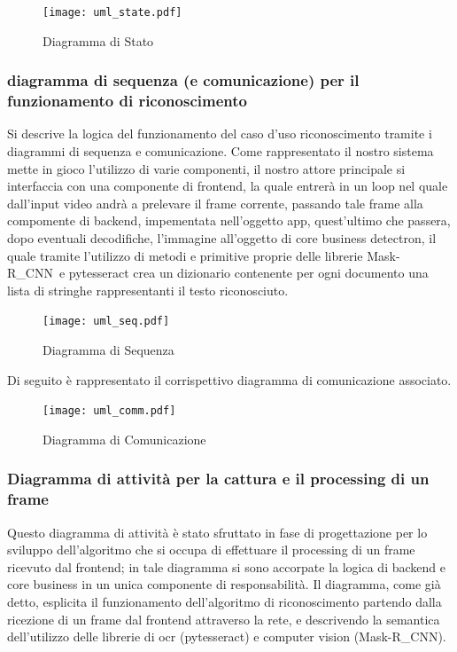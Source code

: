 \documentclass[12pt,a4paper]{article}
\newcommand{\mrcnn}{Mask-R\_CNN}
\begin{document}
\begin{figure}[H]
    \caption{Diagramma di Stato}
    \centering
    \texttt{[image: uml\_state.pdf]}
\end{figure}

\subsubsection{diagramma di sequenza (e comunicazione) per il
funzionamento di riconoscimento}

Si descrive la logica del funzionamento del caso d'uso riconoscimento
tramite i diagrammi di sequenza e comunicazione.
Come rappresentato il nostro sistema mette in gioco l'utilizzo di varie
componenti, il nostro attore principale si interfaccia con una
componente di frontend, la quale entrerà in un loop nel quale dall'input
video andrà a prelevare il frame corrente, passando tale frame alla
compomente di backend, impementata nell'oggetto app, quest'ultimo che
passera, dopo eventuali decodifiche, l'immagine all'oggetto di core
business detectron, il quale tramite l'utilizzo di metodi e primitive
proprie delle librerie \mrcnn\ e pytesseract crea un dizionario
contenente per ogni documento una lista di stringhe rappresentanti il
testo riconosciuto.

\begin{figure}[H]
    \caption{Diagramma di Sequenza}
    \centering
    \texttt{[image: uml\_seq.pdf]}
\end{figure}

Di seguito è rappresentato il corrispettivo diagramma di comunicazione
associato.

\begin{figure}[H]
    \caption{Diagramma di Comunicazione}
    \centering
    \texttt{[image: uml\_comm.pdf]}
\end{figure}

\subsubsection{Diagramma di attività per la cattura e il processing di un frame}

Questo diagramma di attività è stato sfruttato in fase di progettazione
per lo sviluppo dell'algoritmo che si occupa di effettuare il processing
di un frame ricevuto dal frontend; in tale diagramma si sono accorpate
la logica di backend e core business in un unica componente di
responsabilità. Il diagramma, come già detto, esplicita il funzionamento
dell'algoritmo di riconoscimento partendo dalla ricezione di un frame
dal frontend attraverso la rete, e descrivendo la semantica
dell'utilizzo delle librerie di ocr (pytesseract) e computer vision
(\mrcnn).
\end{document}
